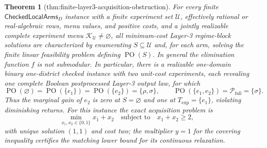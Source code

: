 \documentclass{article}
\newtheorem{theorem}{Theorem}
\begin{document}
\begin{theorem}[thm:finite-layer3-acquisition-obstruction]\label{thm:finite-layer3-acquisition-obstruction}
For every finite \(\mathsf{CheckedLocalArms}_D\) instance with a finite experiment set \(\mathcal U\), effectively rational or real-algebraic rows, menu values, and positive costs, and a jointly realizable complete experiment menu \(\mathcal K_{\mathcal U}\ne\varnothing\), all minimum-cost Layer-3 regime-block solutions are characterized by enumerating \(S\subseteq\mathcal U\) and, for each arm, solving the finite linear feasibility problem defining \(\operatorname{PO}(S)\).  In general the elimination function \(f\) is not submodular.  In particular, there is a realizable one-domain binary one-district checked instance with two unit-cost experiments, each revealing one complete Boolean postprocessed Layer-3 output law, for which
\[
\operatorname{PO}(\varnothing)=\operatorname{PO}(\{e_1\})
=\operatorname{PO}(\{e_2\})=\{\rho,\sigma\},
\qquad
\operatorname{PO}(\{e_1,e_2\})=
\mathcal P_{\mathrm{full}}=\{\sigma\}.
\]
Thus the marginal gain of \(e_2\) is zero at \(S=\varnothing\) and one at \(T_{\mathrm{exp}}=\{e_1\}\), violating diminishing returns.  For this instance the exact acquisition problem is
\[
\min_{x_1,x_2\in\{0,1\}}x_1+x_2
\quad\text{subject to}\quad x_1+x_2\geq2,
\]
with unique solution \((1,1)\) and cost two; the multiplier \(y=1\) for the covering inequality certifies the matching lower bound for its continuous relaxation.
\end{theorem}
\end{document}

